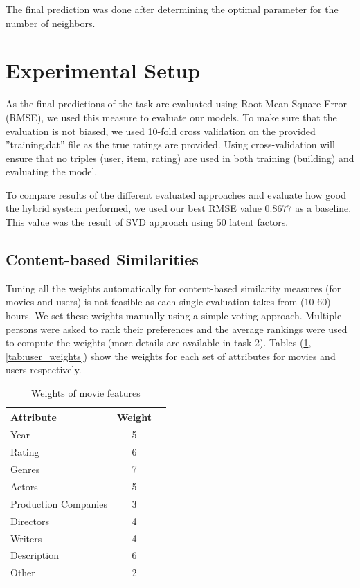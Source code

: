 \documentclass{sigish}
\begin{document}
The final prediction was done after determining the optimal parameter for the number of neighbors.

\section{Experimental Setup}

As the final predictions of the task are evaluated using Root Mean Square Error (RMSE), we used this measure to evaluate our models. To make sure that the evaluation is not biased, we used 10-fold cross validation on the provided ''training.dat'' file as the true ratings are provided. Using cross-validation will ensure that no triples (user, item, rating) are used in both training (building) and evaluating the model.

To compare results of the different evaluated approaches and evaluate how good the hybrid system performed, we used our best RMSE value $ 0.8677 $ as a baseline. This value was the result of SVD approach using $ 50 $ latent factors.

\subsection{Content-based Similarities}
Tuning all the weights automatically for content-based similarity measures (for movies and users) is not feasible as each single evaluation takes from (10-60) hours. We set these weights manually using a simple voting approach. Multiple persons were asked to rank their preferences and the average rankings were used to compute the weights (more details are available in task 2). Tables (\ref{tab:movie_weights}, \ref{tab:user_weights}) show the weights for each set of attributes for movies and users respectively.

\begin{table}[]
\centering
\begin{tabular}{|l|c|c|}
\hline
\textbf{Attribute} & \textbf{Weight} \\ \hline
Year             & 5               \\ \hline
Rating             & 6               \\ \hline
Genres             & 7               \\ \hline
Actors             & 5               \\ \hline
Production Companies             & 3               \\ \hline
Directors             & 4               \\ \hline
Writers             & 4               \\ \hline
Description             & 6               \\ \hline
Other             & 2               \\ \hline
\end{tabular}
\caption{Weights of movie features}
\label{tab:movie_weights}
\end{table}
\end{document}
